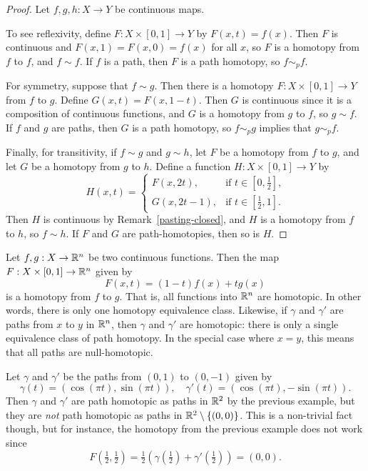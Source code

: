 \begin{proof}
  Let $f, g, h : X \to Y$ be continuous maps.
  
  To see reflexivity, define $F : X \times [0,1] \to Y$ by $F(x,t) = f(x)$. Then $F$ is continuous and $F(x,1) = F(x,0) = f(x)$ for all $x$, so $F$ is a homotopy from $f$ to $f$, and $f \sim f$. If $f$ is a path, then $F$ is a path homotopy, so $f \sim_p f$.
  
  For symmetry, suppose that $f \sim g$. Then there is a homotopy $F : X \times [0,1] \to Y$ from $f$ to $g$. Define $G(x,t) = F(x,1-t)$. Then $G$ is continuous since it is a composition of continuous functions, and $G$ is a homotopy from $g$ to $f$, so $g \sim f$. If $f$ and $g$ are paths, then $G$ is a path homotopy, so $f \sim_p g$ implies that $g \sim_p f$.
  
  Finally, for transitivity, if $f \sim g$ and $g \sim h$, let $F$ be a homotopy from $f$ to $g$, and let $G$ be a homotopy from $g$ to $h$. Define a function $H : X \times [0,1] \to Y$ by
  \[
    H(x,t) = \begin{cases} F(x,2t),& \text{if $t \in [0,\tfrac{1}{2}]$,} \\G(x,2t-1), & \text{if $t \in [\tfrac{1}{2},1]$.} \end{cases}
  \]
  Then $H$ is continuous by Remark~\ref{pasting-closed}, and $H$ is a homotopy from $f$ to $h$, so $f \sim h$. If $F$ and $G$ are path-homotopies, then so is $H$.
\end{proof}
\begin{example}
  Let $f, g : X \to \mathbb{R}^n$ be two continuous functions. Then the map $F : X \times [0,1] \to \mathbb{R}^n$ given by
  \[
    F(x,t) = (1-t)f(x) + tg(x)
  \]
  is a homotopy from $f$ to $g$. That is, all functions into $\mathbb{R}^n$ are homotopic. In other words, there is only one homotopy equivalence class. Likewise, if $\gamma$ and $\gamma'$ are paths from $x$ to $y$ in $\mathbb{R}^n$, then $\gamma$ and $\gamma'$ are homotopic: there is only a single equivalence class of path homotopy. In the special case where $x = y$, this means that all paths are null-homotopic.
\end{example}
\begin{example}
  Let $\gamma$ and $\gamma'$ be the paths from $(0,1)$ to $(0,-1)$ given by
  \[
    \gamma(t) = (\cos (\pi t), \sin (\pi t)), \quad \gamma'(t) = (\cos(\pi t), -\sin(\pi t)).
  \]
  Then $\gamma$ and $\gamma'$ are path homotopic as paths in $\mathbb{R}^2$ by the previous example, but they are \emph{not} path homotopic as paths in $\mathbb{R}^2 \setminus \{(0,0)\}$. This is a non-trivial fact though, but for instance, the homotopy from the previous example does not work since
  \[
    F(\tfrac{1}{2},\tfrac{1}{2}) = \tfrac{1}{2}(\gamma(\tfrac{1}{2}) + \gamma'(\tfrac{1}{2})) = (0,0).
  \]
\end{example}
